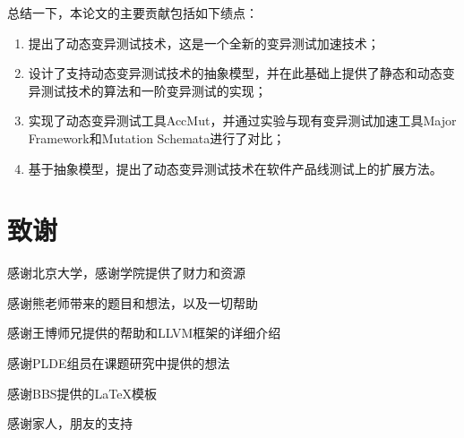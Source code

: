 \documentclass[nofonts]{ctexrep}
\begin{document}
总结一下，本论文的主要贡献包括如下绩点：
\begin{enumerate}
\item
提出了动态变异测试技术，这是一个全新的变异测试加速技术；
\item
设计了支持动态变异测试技术的抽象模型，并在此基础上提供了静态和动态变异测试技术的算法和一阶变异测试的实现；
\item
实现了动态变异测试工具AccMut，并通过实验与现有变异测试加速工具Major Framework和Mutation Schemata进行了对比；
\item
基于抽象模型，提出了动态变异测试技术在软件产品线测试上的扩展方法。
\end{enumerate}




\chapter*{致谢}
感谢北京大学，感谢学院提供了财力和资源

感谢熊老师带来的题目和想法，以及一切帮助

感谢王博师兄提供的帮助和LLVM框架的详细介绍

感谢PLDE组员在课题研究中提供的想法

感谢BBS提供的LaTeX模板

感谢家人，朋友的支持
\end{document}
